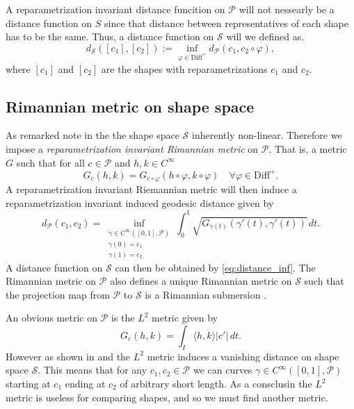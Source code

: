 A reparametrization invariant distance funcition on \(\mathcal{P}\) will not nessearly be a distance function on \(S\) since  that distance between representatives of each shape has to be the same. Thus, a distance function on \(\mathcal{S}\) will we defined as. 
\begin{equation}
  d_\mathcal{S} ([c_1],[c_2]) := \inf_{\varphi \in \text{Diff}^+}{  d_{\mathcal{P}}(c_1,c_2 \circ \varphi)},
  \label{eq:distance_inf}
\end{equation} 
where  \([c_1]\) and  \([c_2]\) are the shapes with reparametrizations \(c_1\) and  \(c_2\). 

\subsection{Rimannian metric on shape space}
As remarked note in \cite{bauer2014overview} the the shape space \(\mathcal{S}\) inherently non-linear. Therefore we impose a \emph{reparametrization invariant Rimannian metric}  on \(\mathcal{P}\). That is, a metric \(G\) such that for all \( c \in \mathcal{P}\) and \(h,k \in C^\infty\)
\begin{equation}
  G_c(h,k) = G_{c \circ \varphi}(h\circ \varphi, k \circ \varphi) \quad \forall \varphi \in \text{Diff}^+.
\end{equation}
A reparametrization invariant Riemannian metric will then induce a reparametrization invariant induced geodesic distance given by 
\begin{equation}
  d_\mathcal{P}(c_1, c_2) = \inf_{
    \substack{
      \gamma \in C^{\infty}([0,1], \mathcal{P}) \\ 
      \gamma(0) = c_1 \\
      \gamma(1) = c_2
    }
  } \int_0^1 \sqrt{G_{\gamma(t)}(\gamma'(t),\gamma'(t))} \, dt.
\end{equation}
A distance function on \(\mathcal{S}\) can then be obtained by \eqref{eq:distance_inf}. The Rimannian metric on \(\mathcal{P}\) also defines a unique Rimannian metric on \(\mathcal{S}\) such that the projection map from \(\mathcal{P}\)  to \(\mathcal{S}\) is a Rimannian submersion \cite[6]{bruveris1016_srvtexample}. 

An obvious metric on \(\mathcal{P}\) is the \(L^2\) metric  given by 
\begin{equation}
  G_c(h,k) = \int_I \langle h, k\rangle \vert c'\vert \,dt. 
\end{equation}
However as shown in \cite{michor2003vanishingl2} and \cite{michor2004vanishing_generalized} the \(L^2\) metric induces a vanishing distance on shape space \(\mathcal{S}\). This means that for any \(c_1, c_2 \in \mathcal{P}\) we can curves \(\gamma \in C^{\infty}([0,1],\mathcal{P})\) starting at \(c_1\) ending at \(c_2\) of arbitrary short length. As a consclusin the \(L^2\) metric is useless for comparing shapes, and so we must find another metric. 

